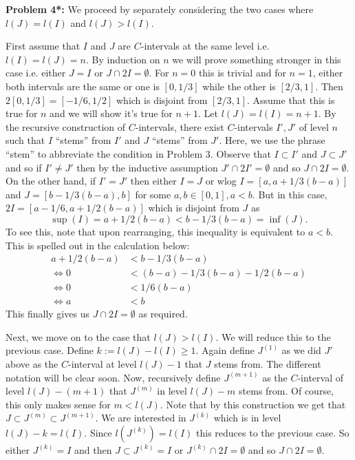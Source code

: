 \documentclass[12pt]{amsart} %
\begin{document}
\bigskip
\noindent
\textbf{Problem 4*:} We proceed by separately considering the two cases where $l(J) = l(I)$ and  $l(J) > l(I)$.

First assume that  $I$ and  $J$ are  $C$-intervals at the same level i.e.  $l(I) = l(J) = n$. By induction on $n$ we will prove something stronger in this case i.e. either  $J = I$ or  $J \cap 2I = \emptyset$. For  $n = 0$ this is trivial and for  $n = 1$, either both intervals are the same or one is  $[0, 1/3]$ while the other is  $[2/3, 1]$. Then $2[0,1/3] = [-1/6, 1/2]$ which is disjoint from  $[2/3,1]$. Assume that this is true for $n$ and we will show it's true for  $n+1$. Let  $l(J) = l(I) = n+1$. By the recursive construction of $C$-intervals, there exist  $C$-intervals  $I', J'$ of level  $n$ such that  $I$ ``stems'' from  $I'$ and  $J$ ``stems'' from  $J'$. Here, we use the phrase ``stem'' to abbreviate the condition in Problem 3. Observe that $I \subset I'$ and $J \subset J'$ and so if $I' \neq J'$ then by the inductive assumption  $J' \cap 2I' = \emptyset$ and so $J \cap 2I = \emptyset$. On the other hand, if $I' = J'$ then either  $I = J$ or wlog  $I = [a, a + 1/3(b-a)]$ and  $J = [b - 1/3(b-a), b]$ for some $a,b \in [0,1], a < b$. But in this case, $2I = [a-1/6, a+ 1/2(b-a)]$ which is disjoint from  $J$ as  $$\sup(I)= a+1/2(b-a) < b - 1/3(b-a) = \inf(J).$$ To see this, note that upon rearranging, this inequality is equivalent to $a < b$. This is spelled out in the calculation below: 
\begin{align*}
	a+1/2(b-a) &< b - 1/3(b-a) \\
	\iff 0 &< (b-a) - 1/3(b-a) - 1/2(b-a) \\
	\iff 0 &< 1/6(b-a) \\
	\iff a &< b
\end{align*}
This finally gives us $J \cap 2I = \emptyset$ as required. 

Next, we move on to the case that  $l(J) > l(I)$. We will reduce this to the previous case. Define $k:= l(J) - l(I) \geq 1$. Again define $J^{(1)}$ as we did $J'$ above as the  $C$-interval at level $l(J) - 1$ that  $J$ stems from.  The different notation will be clear soon. Now, recursively define $J^{(m+1)}$ as the  $C$-interval of level  $l(J) - (m+1)$ that $J^{(m)}$ in level $l(J) - m$ stems from. Of course, this only makes sense for  $m < l(J)$. Note that by this construction we get that $J \subset J^{(m)} \subset  J^{(m+1)}$. We are interested in $J^{(k)}$ which is in level  $l(J) - k = l(I)$. Since  $l(J^{(k)}) = l(I)$ this reduces to the previous case. So either $J^{(k)} = I$ and then $J \subset J^{(k)} = I$ or $J^{(k)} \cap 2I = \emptyset$ and so  $J \cap 2I = \emptyset$. 
\end{document}
